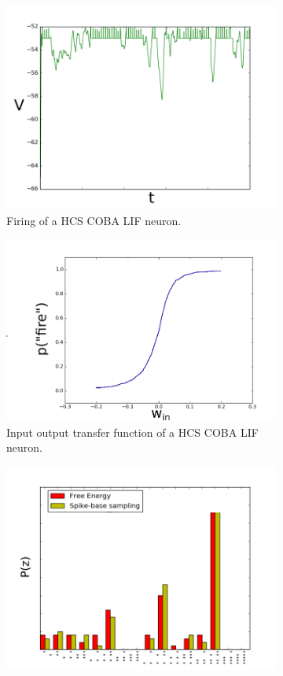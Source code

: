 \begin{figure}
	\centering
	\begin{subfigure}[t]{.5\textwidth}
  		\centering
  		\includegraphics[width=.8\linewidth]{imgs/coba_lif_act.png}
  		\caption{Firing of a HCS COBA LIF neuron.}
  		\label{fig:cobahcs1}
	\end{subfigure}%
	\begin{subfigure}[t]{.5\textwidth}
  		\centering
  		\includegraphics[width=.8\linewidth]{imgs/coba_lif_sigmoid.png}
  		\caption{Input output transfer function of a HCS COBA LIF neuron.}
  		\label{fig:cobahcs2}
	\end{subfigure}
	\begin{subfigure}[t]{.5\textwidth}
  		\centering
  		\includegraphics[width=.8\linewidth]{imgs/coba_lif_bm2.png}

\end{subfigure}
\end{figure}
